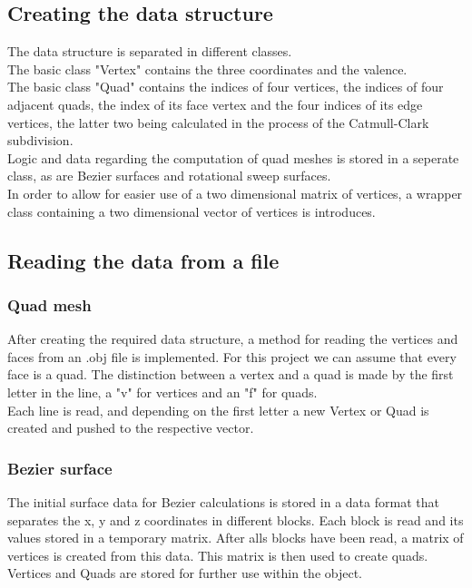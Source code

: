 \documentclass[12pt,a4paper]{scrartcl}
\begin{document}
\subsection{Creating the data structure}
The data structure is separated in different classes. \\
The basic class "Vertex" contains the three coordinates and the valence. \\ 
The basic class "Quad" contains the indices of four vertices, the indices of four adjacent quads, the index of its face vertex and the four indices of its edge vertices, the latter two being calculated in the process of the Catmull-Clark subdivision. \\
Logic and data regarding the computation of quad meshes is stored in a seperate class, as are Bezier surfaces and rotational sweep surfaces. \\
In order to allow for easier use of a two dimensional matrix of vertices, a wrapper class containing a two dimensional vector of vertices is introduces. \\

\subsection{Reading the data from a file}
\subsubsection{Quad mesh}
After creating the required data structure, a method for reading the vertices and faces from an .obj file is implemented. For this project we can assume that every face is a quad. The distinction between a vertex and a quad is made by the first letter in the line, a "v" for vertices and an "f" for quads. \\
Each line is read, and depending on the first letter a new Vertex or Quad is created and pushed to the respective vector.
\subsubsection{Bezier surface}\label{read-bezier}
The initial surface data for Bezier calculations is stored in a data format that separates the x, y and z coordinates in different blocks. Each block is read and its values stored in a temporary matrix. After alls blocks have been read, a matrix of vertices is created from this data. This matrix is then used to create quads. Vertices and Quads are stored for further use within the object.
\end{document}
